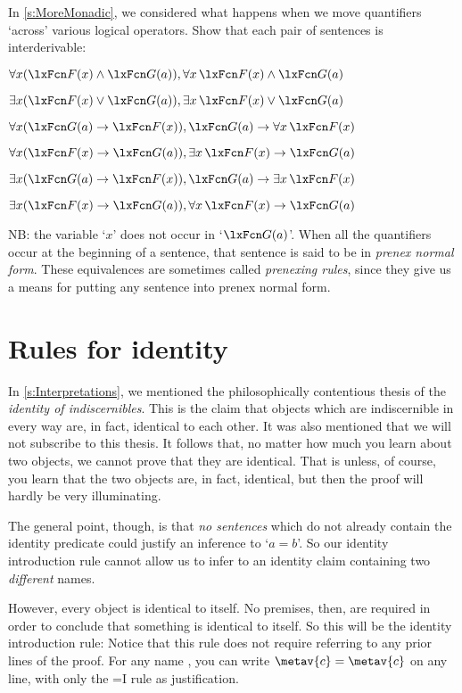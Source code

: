 \problempart
In \cref{s:MoreMonadic}, we considered what happens when we move quantifiers `across' various logical operators. Show that each pair of sentences is interderivable:
\begin{compactlist}
\item $\forall x(\atom{F}{x} \eand \atom{G}{a}), \forall x\,\atom{F}{x} \eand \atom{G}{a}$
\item $\exists x(\atom{F}{x} \eor \atom{G}{a}), \exists x\,\atom{F}{x} \eor \atom{G}{a}$
\item $\forall x(\atom{G}{a} \eif \atom{F}{x}), \atom{G}{a} \eif \forall x\,\atom{F}{x}$
\item $\forall x(\atom{F}{x} \eif \atom{G}{a}), \exists x\,\atom{F}{x} \eif \atom{G}{a}$
\item $\exists x(\atom{G}{a} \eif \atom{F}{x}), \atom{G}{a} \eif \exists x\,\atom{F}{x}$
\item $\exists x(\atom{F}{x} \eif \atom{G}{a}), \forall x\,\atom{F}{x} \eif \atom{G}{a}$
\end{compactlist}
NB: the variable `$x$' does not occur in `$\atom{G}{a}$'. When all the quantifiers occur at the beginning of a sentence, that sentence is said to be in \emph{prenex normal form}. These equivalences are sometimes called \emph{prenexing rules}, since they give us a means for putting any sentence into prenex normal form.


\chapter{Rules for identity}
In \cref{s:Interpretations}, we mentioned the philosophically contentious thesis of the \emph{identity of indiscernibles}. This is the claim that objects which are indiscernible in every way are, in fact, identical to each other. It was also mentioned that we will not subscribe to this thesis. It follows that, no matter how much you learn about two objects, we cannot prove that they are identical. That is unless, of course, you learn that the two objects are, in fact, identical, but then the proof will hardly be very illuminating.

The general point, though, is that \emph{no sentences} which do not already contain the identity predicate could justify an inference to `$a=b$'. So our identity introduction rule cannot allow us to infer to an identity claim containing two \emph{different} names.

However, every object is identical to itself. No premises, then, are required in order to conclude that something is identical to itself. So this will be the identity introduction rule:
Notice that this rule does not require referring to any prior lines of the proof. For any name , you can write $\metav{c}=\metav{c}$ on any line, with only the {=}I rule as justification.


